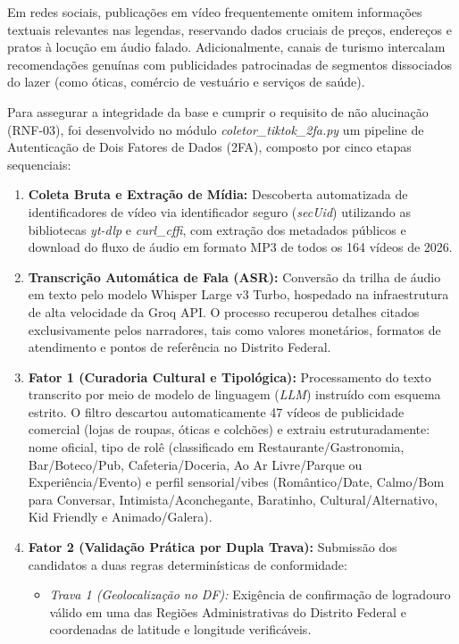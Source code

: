 \documentclass[11pt,a4paper]{article}
\begin{document}
Em redes sociais, publicações em vídeo frequentemente omitem informações textuais relevantes nas legendas, reservando dados cruciais de preços, endereços e pratos à locução em áudio falado. Adicionalmente, canais de turismo intercalam recomendações genuínas com publicidades patrocinadas de segmentos dissociados do lazer (como óticas, comércio de vestuário e serviços de saúde). 

Para assegurar a integridade da base e cumprir o requisito de não alucinação (RNF-03), foi desenvolvido no módulo \textit{coletor\_tiktok\_2fa.py} um pipeline de Autenticação de Dois Fatores de Dados (2FA), composto por cinco etapas sequenciais:

\begin{enumerate}[label=\alph*)]
\item \textbf{Coleta Bruta e Extração de Mídia:} Descoberta automatizada de identificadores de vídeo via identificador seguro (\textit{secUid}) utilizando as bibliotecas \textit{yt-dlp} e \textit{curl\_cffi}, com extração dos metadados públicos e download do fluxo de áudio em formato MP3 de todos os 164 vídeos de 2026.
\item \textbf{Transcrição Automática de Fala (ASR):} Conversão da trilha de áudio em texto pelo modelo Whisper Large v3 Turbo, hospedado na infraestrutura de alta velocidade da Groq API. O processo recuperou detalhes citados exclusivamente pelos narradores, tais como valores monetários, formatos de atendimento e pontos de referência no Distrito Federal.
\item \textbf{Fator 1 (Curadoria Cultural e Tipológica):} Processamento do texto transcrito por meio de modelo de linguagem (\textit{LLM}) instruído com esquema estrito. O filtro descartou automaticamente 47 vídeos de publicidade comercial (lojas de roupas, óticas e colchões) e extraiu estruturadamente: nome oficial, tipo de rolê (classificado em Restaurante/Gastronomia, Bar/Boteco/Pub, Cafeteria/Doceria, Ao Ar Livre/Parque ou Experiência/Evento) e perfil sensorial/vibes (Romântico/Date, Calmo/Bom para Conversar, Intimista/Aconchegante, Baratinho, Cultural/Alternativo, Kid Friendly e Animado/Galera).
\item \textbf{Fator 2 (Validação Prática por Dupla Trava):} Submissão dos candidatos a duas regras determinísticas de conformidade:
\begin{itemize}
\item \textit{Trava 1 (Geolocalização no DF):} Exigência de confirmação de logradouro válido em uma das Regiões Administrativas do Distrito Federal e coordenadas de latitude e longitude verificáveis.

\end{itemize}
\end{enumerate}
\end{document}
